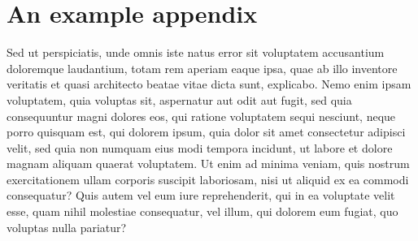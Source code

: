\chapter{An example appendix}

Sed ut perspiciatis, unde omnis iste natus error sit voluptatem accusantium
doloremque laudantium, totam rem aperiam eaque ipsa, quae ab illo inventore
veritatis et quasi architecto beatae vitae dicta sunt, explicabo. Nemo enim
ipsam voluptatem, quia voluptas sit, aspernatur aut odit aut fugit, sed quia
consequuntur magni dolores eos, qui ratione voluptatem sequi nesciunt, neque
porro quisquam est, qui dolorem ipsum, quia dolor sit amet consectetur adipisci
velit, sed quia non numquam eius modi tempora incidunt, ut labore et dolore
magnam aliquam quaerat voluptatem. Ut enim ad minima veniam, quis nostrum
exercitationem ullam corporis suscipit laboriosam, nisi ut aliquid ex ea
commodi consequatur? Quis autem vel eum iure reprehenderit, qui in ea voluptate
velit esse, quam nihil molestiae consequatur, vel illum, qui dolorem eum
fugiat, quo voluptas nulla pariatur?
